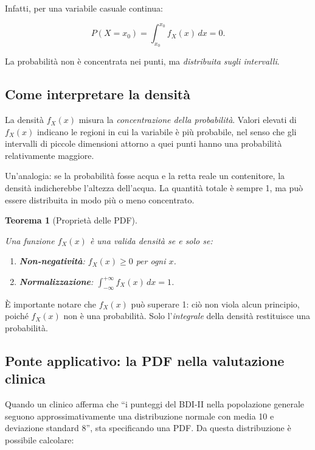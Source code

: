 \documentclass[
  italian,
  letterpaper,
  a4paper,
  11pt,
  open=any]{scrbook}
\providecommand{\tightlist}{%
  \setlength{\itemsep}{0pt}\setlength{\parskip}{0pt}}
\theoremstyle{plain}
\newtheorem{theorem}{Teorema}[chapter]
\theoremstyle{definition}
\theoremstyle{definition}
\theoremstyle{remark}
\begin{document}
Infatti, per una variabile casuale continua:

\[
P(X = x_0) = \int_{x_0}^{x_0} f_X(x)\,dx = 0.
\]

La probabilità non è concentrata nei punti, ma \emph{distribuita sugli
intervalli}.

\subsection{Come interpretare la
densità}\label{come-interpretare-la-densituxe0}

La densità \(f_X(x)\) misura la \emph{concentrazione della probabilità}.
Valori elevati di \(f_X(x)\) indicano le regioni in cui la variabile è
più probabile, nel senso che gli intervalli di piccole dimensioni
attorno a quei punti hanno una probabilità relativamente maggiore.

Un'analogia: se la probabilità fosse acqua e la retta reale un
contenitore, la densità indicherebbe l'altezza dell'acqua. La quantità
totale è sempre 1, ma può essere distribuita in modo più o meno
concentrato.

\begin{theorem}[Proprietà delle
PDF]\protect\hypertarget{thm-pdf-properties}{}\label{thm-pdf-properties}

Una funzione \(f_X(x)\) è una valida densità se e solo se:

\begin{enumerate}
\def\labelenumi{\arabic{enumi}.}
\tightlist
\item
  \textbf{Non-negatività}: \(f_X(x) \geq 0\) per ogni \(x\).
\item
  \textbf{Normalizzazione}: \(\int_{-\infty}^{+\infty} f_X(x)\,dx = 1\).
\end{enumerate}

\end{theorem}

È importante notare che \(f_X(x)\) può superare 1: ciò non viola alcun
principio, poiché \(f_X(x)\) non è una probabilità. Solo
l'\emph{integrale} della densità restituisce una probabilità.

\subsection{Ponte applicativo: la PDF nella valutazione
clinica}\label{ponte-applicativo-la-pdf-nella-valutazione-clinica}

Quando un clinico afferma che ``i punteggi del BDI-II nella popolazione
generale seguono approssimativamente una distribuzione normale con media
10 e deviazione standard 8'', sta specificando una PDF. Da questa
distribuzione è possibile calcolare:
\end{document}
